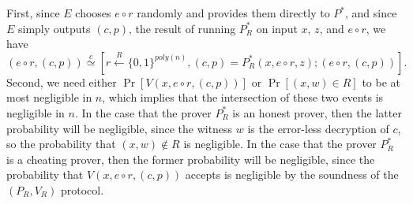 \documentclass[draft]{article}
\newcommand{\cid}{\overset{c}{\simeq}}
\newcommand{\getr}{\overset{R}{\gets}}
\newcommand{\getrsingle}{\getr\{0, 1\}}
\newcommand{\getrpoly}{\getrsingle^{poly(n)}}
\begin{document}
\begin{enumerate}
\begin{enumerate}
\begin{description}
      First, since $E$ chooses $e\circ r$ randomly and provides them directly to $P^*$, and since $E$ simply outputs $(c, p)$, the result of running $P_R^*$ on input $x$, $z$, and $e\circ r$, we have
      \begin{displaymath}
        (e\circ r, (c, p))\cid [r\getrpoly, (c, p)=P_R^*(x, e\circ r, z); (e\circ r, (c, p))].
      \end{displaymath}
      Second, we need either $\Pr[V(x, e\circ r, (c, p))]$ or $\Pr[(x, w)\in R]$ to be at most negligible in $n$, which implies that the intersection of these two events is negligible in $n$.
      In the case that the prover $P_R^*$ is an honest prover, then the latter probability will be negligible, since the witness $w$ is the error-less decryption of $c$, so the probability that $(x, w)\notin R$ is negligible.
      In the case that the prover $P_R^*$ is a cheating prover, then the former probability will be negligible, since the probability that $V(x, e\circ r, (c, p))$ accepts is negligible by the soundness of the $(P_R, V_R)$ protocol.


\end{description}
\end{enumerate}
\end{enumerate}
\end{document}
